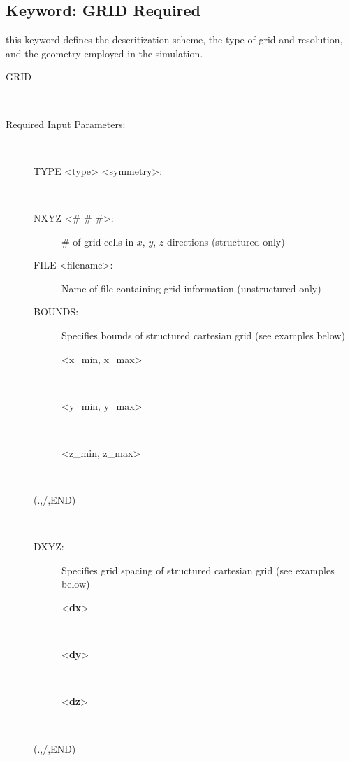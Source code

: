 \documentclass[12pt]{article}
\begin{document}
\subsection{Keyword: GRID \hfill Required}

 this keyword defines the descritization scheme, the type of grid and resolution, and the geometry employed in the simulation.

\begin{description}
\item[GRID]~
\item[Required Input Parameters:]~

\begin{description}
\item[TYPE <type> <symmetry>:] ~


\item[NXYZ <\# \# \#>:] \# of grid cells in $x$, $y$, $z$ directions (structured only)

\item[FILE <filename>:] Name of file containing grid information (unstructured only)

\item[BOUNDS:] Specifies bounds of structured cartesian grid (see examples below)
\begin{description}
\item[<x\_min, x\_max>]~
\item[<y\_min, y\_max>]~
\item[<z\_min, z\_max>]~
\end{description}
\item[(.,/,END)] ~

\item[DXYZ:] Specifies grid spacing of structured cartesian grid (see examples below)
\begin{description}
\item[<{\bf dx}>] ~
\item[<{\bf dy}>] ~
\item[<{\bf dz}>] ~
\end{description}
\item[(.,/,END)] ~
\end{description}


\end{description}
\end{document}
